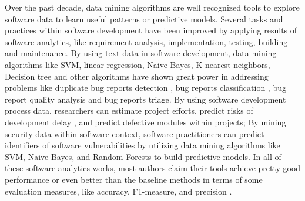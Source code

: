 Over the past decade, data mining algorithms are well
 recognized tools to explore software data to learn useful patterns or predictive
 models. Several tasks and practices within software development have been
 improved by applying results of software analytics, like requirement analysis, implementation,
 testing, building and maintenance.
By using text data in software development, data mining algorithms like SVM, 
linear regression, Naive Bayes, K-nearest neighbors, Decision tree and other
algorithms have shown great power in addressing problems like
duplicate bug reports detection \cite{sun2010discriminative,jalbert2008automated,alipour2013contextual,nguyen2012duplicate},
bug reports classification \cite{antoniol2008bug,zanetti2013categorizing,lamkanfi2011comparing,tian2013drone}, 
bug report quality analysis \cite{bettenburg2008makes} and bug reports
triage\cite{anvik2006should, bhattacharya2010fine, lin2009empirical}. 
By using software development process data,
researchers can estimate project efforts\cite{dejaeger2012data,kocaguneli2012value, menzies2013local},
predict risks of development delay \cite{da2014empirical,choetkiertikul2015predicting}, 
and predict defective modules within projects\cite{me07b,hall11,lessmann2008benchmarking};
By mining security data within software context, software practitioners can predict identifiers of software vulnerabilities\cite{shin2011evaluating,scandariato2012predicting,medeiros2014automatic} by utilizing data mining algorithms like SVM, Naive Bayes, and
Random Forests to build 
predictive models. In all of these software analytics works,  most authors claim
their tools achieve pretty good performance or even better than the baseline methods in terms
of some evaluation measures, like accuracy, F1-measure, and precision \cite{lamkanfi2011comparing, alipour2013contextual,lin2009empirical,lessmann2008benchmarking,hall11}.

